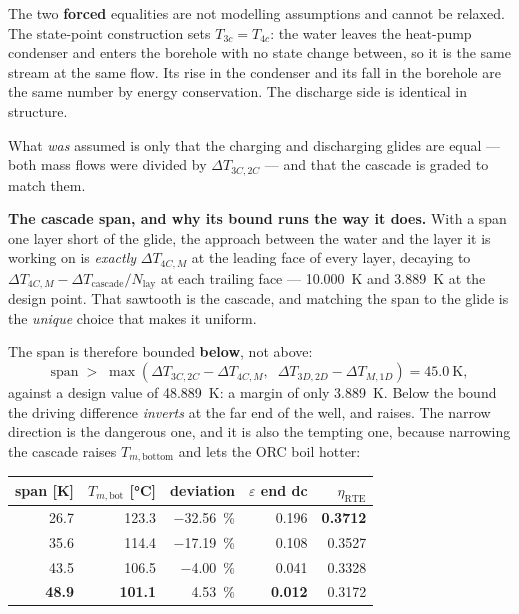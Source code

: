 \noindent
The two \textbf{forced} equalities are not modelling assumptions and cannot be
relaxed. The state-point construction sets $T_{3c}=T_{4c}$: the water leaves the
heat-pump condenser and enters the borehole with no state change between, so it
is the same stream at the same flow. Its rise in the condenser and its fall in
the borehole are the same number by energy conservation. The discharge side is
identical in structure.

What \emph{was} assumed is only that the charging and discharging glides are
equal --- both mass flows were divided by $\Delta T_{3C,2C}$ --- and that the
cascade is graded to match them.

\medskip
\noindent\textbf{The cascade span, and why its bound runs the way it does.}
With a span one layer short of the glide, the approach between the water and
the layer it is working on is \emph{exactly} $\Delta T_{4C,M}$ at the leading
face of every layer, decaying to $\Delta T_{4C,M}-\Delta T_{\mathrm{cascade}}/N_{\mathrm{lay}}$
at each trailing face --- \SI{10.000}{\kelvin} and \SI{3.889}{\kelvin} at the
design point. That sawtooth is the cascade, and matching the span to the glide
is the \emph{unique} choice that makes it uniform.

The span is therefore bounded \textbf{below}, not above:
\begin{equation}
  \mathrm{span} \;>\; \max\!\left(
    \Delta T_{3C,2C}-\Delta T_{4C,M},\;\;
    \Delta T_{3D,2D}-\Delta T_{M,1D}\right) = \SI{45.0}{\kelvin},
  \label{eq:span-bound}
\end{equation}
against a design value of \SI{48.889}{\kelvin}: a margin of only
\SI{3.889}{\kelvin}. Below the bound the driving difference \emph{inverts} at
the far end of the well, and  raises. The narrow direction
is the dangerous one, and it is also the tempting one, because narrowing the
cascade raises $T_{m,\mathrm{bottom}}$ and lets the ORC boil hotter:

\begin{center}
\begin{tabular}{@{}r r r r r@{}}
\toprule
span [\si{\kelvin}] & $T_{m,\mathrm{bot}}$ [\si{\celsius}] & deviation
 & $\varepsilon$ end dc & $\eta_{\mathrm{RTE}}$ \\
\midrule
26.7 & 123.3 & \SI{-32.56}{\percent} & 0.196 & \textbf{0.3712} \\
35.6 & 114.4 & \SI{-17.19}{\percent} & 0.108 & 0.3527 \\
43.5 & 106.5 & \SI{-4.00}{\percent}  & 0.041 & 0.3328 \\
\textbf{48.9} & \textbf{101.1} & \SI{+4.53}{\percent} & \textbf{0.012} & 0.3172 \\
\bottomrule
\end{tabular}
\end{center}

